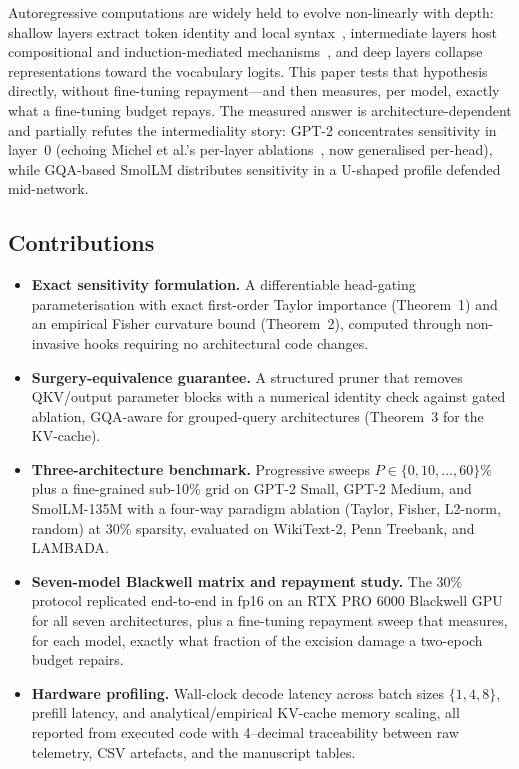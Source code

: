\documentclass[10pt,journal,compsoc]{IEEEtran}
\begin{document}
Autoregressive computations are widely held to evolve non-linearly with depth:
shallow layers extract token identity and local syntax~\cite{khandelwal2019sharp},
intermediate layers host compositional and induction-mediated
mechanisms~\cite{elhage2021mathematical, olsson2022context}, and deep layers collapse
representations toward the vocabulary logits. This paper tests that hypothesis
directly, without fine-tuning repayment---and then measures, per model, exactly
what a fine-tuning budget repays. The measured answer is architecture-dependent and partially
refutes the intermediality story: GPT-2 concentrates sensitivity in layer~0 (echoing
Michel et al.'s per-layer ablations~\cite{michel2019sixteen}, now generalised
per-head), while GQA-based SmolLM distributes sensitivity in a U-shaped profile
defended mid-network.

\subsection{Contributions}
\begin{itemize}
  \item \textbf{Exact sensitivity formulation.} A differentiable head-gating
  parameterisation with exact first-order Taylor importance (Theorem~1) and an
  empirical Fisher curvature bound (Theorem~2), computed through non-invasive
  hooks requiring no architectural code changes.
  \item \textbf{Surgery-equivalence guarantee.} A structured pruner that removes
  QKV/output parameter blocks with a numerical identity check against gated
  ablation, GQA-aware for grouped-query architectures (Theorem~3 for the KV-cache).
  \item \textbf{Three-architecture benchmark.} Progressive sweeps
  $P\in\{0,10,\dots,60\}\%$ plus a fine-grained sub-10\% grid on GPT-2 Small,
  GPT-2 Medium, and SmolLM-135M with a four-way paradigm ablation (Taylor, Fisher,
  L2-norm, random) at $30\%$ sparsity, evaluated on WikiText-2, Penn Treebank,
  and LAMBADA.
  \item \textbf{Seven-model Blackwell matrix and repayment study.} The 30\%
  protocol replicated end-to-end in fp16 on an RTX PRO 6000 Blackwell GPU for
  all seven architectures, plus a fine-tuning repayment sweep that measures,
  for each model, exactly what fraction of the excision damage a two-epoch
  budget repairs.
  \item \textbf{Hardware profiling.} Wall-clock decode latency across batch sizes
  $\{1,4,8\}$, prefill latency, and analytical/empirical KV-cache memory scaling,
  all reported from executed code with 4--decimal traceability between raw
  telemetry, CSV artefacts, and the manuscript tables.
\end{itemize}
\end{document}
